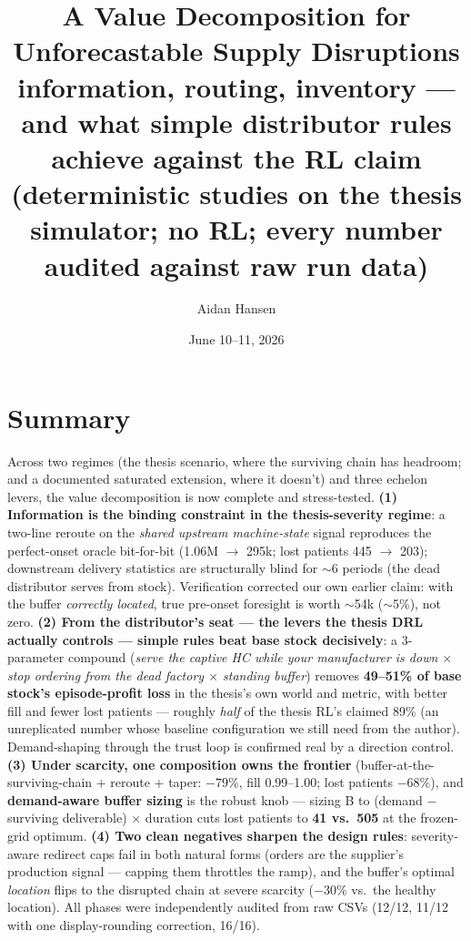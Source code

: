 \documentclass[11pt]{article}
\title{\textbf{A Value Decomposition for Unforecastable Supply Disruptions}\\
\large information, routing, inventory --- and what simple distributor rules achieve
against the RL claim\\
\normalsize (deterministic studies on the thesis simulator; no RL; every number audited
against raw run data)}
\author{Aidan Hansen}
\date{June 10--11, 2026}
\begin{document}
\maketitle

\section*{Summary}
Across two regimes (the thesis scenario, where the surviving chain has headroom; and a
documented saturated extension, where it doesn't) and three echelon levers, the value
decomposition is now complete and stress-tested. \textbf{(1) Information is the binding
constraint in the thesis-severity regime}: a two-line reroute on the \emph{shared upstream
machine-state} signal reproduces the perfect-onset oracle bit-for-bit (1.06M $\to$ 295k;
lost patients 445 $\to$ 203); downstream delivery statistics are structurally blind for
$\sim$6 periods (the dead distributor serves from stock). Verification corrected our own
earlier claim: with the buffer \emph{correctly located}, true pre-onset foresight is worth
$\sim$54k ($\sim$5\%), not zero. \textbf{(2) From the distributor's seat --- the levers the
thesis DRL actually controls --- simple rules beat base stock decisively}: a 3-parameter
compound (\emph{serve the captive HC while your manufacturer is down $\times$ stop ordering
from the dead factory $\times$ standing buffer}) removes \textbf{49--51\% of base stock's
episode-profit loss} in the thesis's own world and metric, with better fill and fewer lost
patients --- roughly \emph{half} of the thesis RL's claimed 89\% (an unreplicated number
whose baseline configuration we still need from the author). Demand-shaping through the
trust loop is confirmed real by a direction control. \textbf{(3) Under scarcity, one
composition owns the frontier} (buffer-at-the-surviving-chain + reroute + taper: $-79\%$,
fill 0.99--1.00; lost patients $-68\%$), and \textbf{demand-aware buffer sizing} is the
robust knob --- sizing B to (demand $-$ surviving deliverable) $\times$ duration cuts lost
patients to \textbf{41 vs.\ 505} at the frozen-grid optimum. \textbf{(4) Two clean negatives
sharpen the design rules}: severity-aware redirect caps fail in both natural forms (orders
are the supplier's production signal --- capping them throttles the ramp), and the buffer's
optimal \emph{location} flips to the disrupted chain at severe scarcity ($-30\%$ vs.\ the
healthy location). All phases were independently audited from raw CSVs (12/12, 11/12 with
one display-rounding correction, 16/16).
\end{document}
